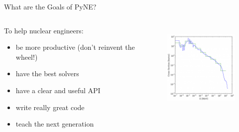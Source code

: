 \documentclass[xcolor=x11names,compress]{beamer}
\renewcommand{\(}{\begin{columns}}
\renewcommand{\)}{\end{columns}}
\newcommand{\<}[1]{\begin{column}{#1}}
\renewcommand{\>}{\end{column}}
\begin{document}
\begin{frame}{What are the Goals of PyNE?}

    \begin{columns}
    \begin{column}{0.45\textwidth}
        To help nuclear engineers:
        \begin{itemize}
        \item be more \alert{productive} (don't reinvent the wheel!)
        \item have the \alert{best solvers}
        \item have a \alert{clear and useful API}
        \item write really \alert{great code}
        \item \alert{teach} the next generation
        \end{itemize}
  	\end{column}
 	\begin{column}{0.45\textwidth}
 	   \begin{center}
 	   \begin{figure}
 	   \includegraphics[height=1.75in,clip]{data_sources_thumb.png}  \\
	   \end{figure}
 	   \end{center}
  	\end{column}
	\end{columns}

\end{frame}

\end{document}
